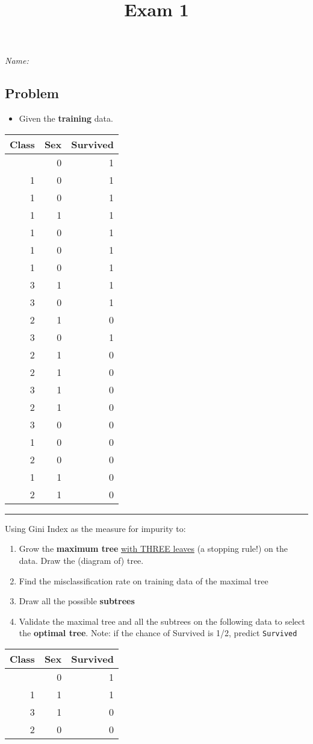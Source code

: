 \documentclass[
  letterpaper,
  DIV=11,
  numbers=noendperiod]{scrartcl}
\title{Exam 1}
\author{}
\date{}
\providecommand{\tightlist}{%
  \setlength{\itemsep}{0pt}\setlength{\parskip}{0pt}}\usepackage{longtable,booktabs,array}
\begin{document}
\maketitle

\emph{Name:}

\subsection{Problem}\label{problem}

\begin{itemize}
\tightlist
\item
  Given the \textbf{training} data.
\end{itemize}

\begin{longtable}[]{@{}rrr@{}}
\toprule\noalign{}
Class & Sex & Survived \\
\midrule\noalign{}
\endhead
\bottomrule\noalign{}
\endlastfoot
1 & 0 & 1 \\
1 & 0 & 1 \\
1 & 0 & 1 \\
1 & 1 & 1 \\
1 & 0 & 1 \\
1 & 0 & 1 \\
1 & 0 & 1 \\
3 & 1 & 1 \\
3 & 0 & 1 \\
2 & 1 & 0 \\
3 & 0 & 1 \\
2 & 1 & 0 \\
2 & 1 & 0 \\
3 & 1 & 0 \\
2 & 1 & 0 \\
3 & 0 & 0 \\
1 & 0 & 0 \\
2 & 0 & 0 \\
1 & 1 & 0 \\
2 & 1 & 0 \\
\end{longtable}

\begin{center}\rule{0.5\linewidth}{0.5pt}\end{center}

Using Gini Index as the measure for impurity to:

\begin{enumerate}
\def\labelenumi{\arabic{enumi}.}
\tightlist
\item
  Grow the \textbf{maximum tree} \ul{with THREE leaves} (a stopping
  rule!) on the data. Draw the (diagram of) tree.
\item
  Find the misclassification rate on training data of the maximal tree
\item
  Draw all the possible \textbf{subtrees}
\item
  Validate the maximal tree and all the subtrees on the following data
  to select the \textbf{optimal tree}. Note: if the chance of Survived
  is 1/2, predict \texttt{Survived}
\end{enumerate}

\begin{longtable}[]{@{}rrr@{}}
\toprule\noalign{}
Class & Sex & Survived \\
\midrule\noalign{}
\endhead
\bottomrule\noalign{}
\endlastfoot
1 & 0 & 1 \\
1 & 1 & 1 \\
3 & 1 & 0 \\
2 & 0 & 0 \\
\end{longtable}
\end{document}
